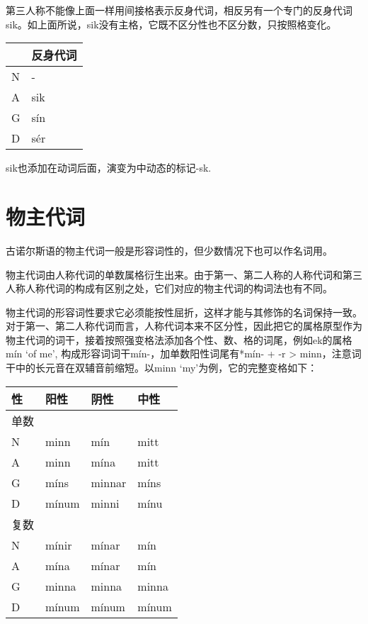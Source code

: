 \begin{introduction}[章节要点]
第三人称不能像上面一样用间接格表示反身代词，相反另有一个专门的反身代词sik。如上面所说，sik没有主格，它既不区分性也不区分数，只按照格变化。

\begin{longtable}{ll}
    \toprule
      & 反身代词 \\
    \midrule
    \endhead
    \bottomrule
    \endfoot
    N & -        \\
    A & sik      \\
    G & sín      \\
    D & sér      \\
\end{longtable}

sik也添加在动词后面，演变为中动态的标记-sk.

\section{物主代词}\label{物主代词}

古诺尔斯语的物主代词一般是形容词性的，但少数情况下也可以作名词用。

物主代词由人称代词的单数属格衍生出来。由于第一、第二人称的人称代词和第三人称人称代词的构成有区别之处，它们对应的物主代词的构词法也有不同。

物主代词的形容词性要求它必须能按性屈折，这样才能与其修饰的名词保持一致。对于第一、第二人称代词而言，人称代词本来不区分性，因此把它的属格原型作为物主代词的词干，接着按照强变格法添加各个性、数、格的词尾，例如ek的属格mín `of me‌', 构成形容词词干mín-，加单数阳性词尾有*mín- + -r > minn，注意词干中的长元音在双辅音前缩短。以minn `my‌'为例，它的完整变格如下：

\begin{longtable}{llll}
    \toprule
    性   & 阳性  & 阴性   & 中性  \\
    \midrule
    \endhead
    \bottomrule
    \endfoot
    单数 &       &        &       \\
    N    & minn  & mín    & mitt  \\
    A    & minn  & mína   & mitt  \\
    G    & míns  & minnar & míns  \\
    D    & mínum & minni  & mínu  \\
    复数 &       &        &       \\
    N    & mínir & mínar  & mín   \\
    A    & mína  & mínar  & mín   \\
    G    & minna & minna  & minna \\
    D    & mínum & mínum  & mínum \\
\end{longtable}


\end{introduction}
